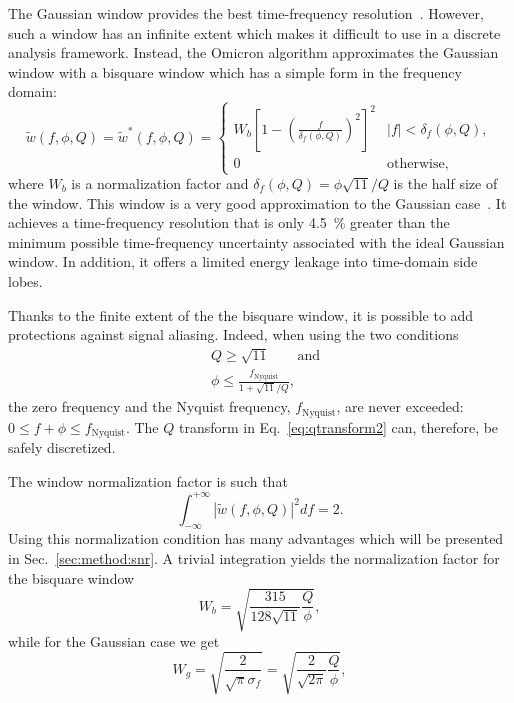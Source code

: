 The Gaussian window provides the best time-frequency resolution~\cite{Gabor:1946}. However, such a window has an infinite extent which makes it difficult to use in a discrete analysis framework. Instead, the Omicron algorithm approximates the Gaussian window with a bisquare window which has a simple form in the frequency domain:
\begin{equation}
  \tilde{w}(f,\phi,Q) = \tilde{w}^*(f,\phi,Q) =
  \begin{cases}
    W_b\left[1 - \left(\frac{f}{\delta_f(\phi,Q)}\right)^2 \right]^2 & |f| < \delta_f(\phi,Q), \\
    0 & \textrm{otherwise},
  \end{cases}
  \label{eq:bisquare}
\end{equation}
where $W_b$ is a normalization factor and $\delta_f(\phi,Q)=\phi\sqrt{11}/Q$ is the half size of the window. This window is a very good approximation to the Gaussian case~\cite{Chatterji:2004}. It achieves a time-frequency resolution that is only 4.5~\% greater than the minimum possible time-frequency uncertainty associated with the ideal Gaussian window. In addition, it offers a limited energy leakage into time-domain side lobes.

Thanks to the finite extent of the the bisquare window, it is possible to add protections against signal aliasing. Indeed, when using the two conditions
\begin{align}
  &Q\ge\sqrt{11} \qquad \text{and}\label{eq:antialias1} \\
  &\phi \le \frac{f_{\text{Nyquist}}}{1+\sqrt{11}/Q}, \label{eq:antialias2}
\end{align}
the zero frequency and the Nyquist frequency, $f_{\text{Nyquist}}$, are never exceeded: $0 \le f + \phi \le f_{\text{Nyquist}}$. The $Q$ transform in Eq.~\ref{eq:qtransform2} can, therefore, be safely discretized.

The window normalization factor is such that
\begin{equation}
  \int_{-\infty}^{+\infty}{|\tilde{w}(f,\phi,Q)|^2df} = 2.
  \label{eq:winnorm}
\end{equation}
Using this normalization condition has many advantages which will be presented in Sec.~\ref{sec:method:snr}. A trivial integration yields the normalization factor for the bisquare window
\begin{equation}
  W_b = \sqrt{\frac{315}{128\sqrt{11}} \frac{Q}{\phi}},
  \label{eq:Wb}
\end{equation}
while for the Gaussian case we get
\begin{equation}
  W_g = \sqrt{\frac{2}{\sqrt{\pi}\sigma_f}} = \sqrt{\frac{2}{\sqrt{2\pi}} \frac{Q}{\phi}},
  \label{eq:Wg}
\end{equation}

